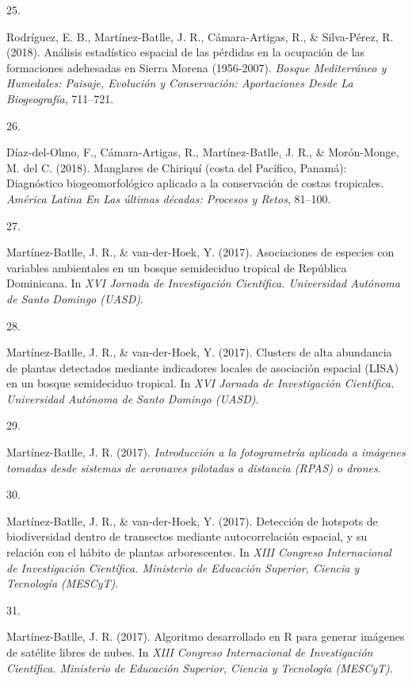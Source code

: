 \documentclass[10pt,a4paper,]{article}
\newlength{\cslhangindent}
\newlength{\csllabelwidth}
\newcommand{\CSLLeftMargin}[1]{\parbox[t]{\csllabelwidth}{\hfill #1~}}
\newcommand{\CSLRightInline}[1]{\parbox[t]{\linewidth - \cslhangindent - \csllabelwidth}{#1}\vspace{0.8ex}}
\begin{document}
\leavevmode\hypertarget{ref-rodriguez2018analisis}{}%
\CSLLeftMargin{25. }
\CSLRightInline{Rodríguez, E. B., Martínez-Batlle, J. R.,
Cámara-Artigas, R., \& Silva-Pérez, R. (2018). Análisis estadístico
espacial de las pérdidas en la ocupación de las formaciones adehesadas
en Sierra Morena (1956-2007). \emph{Bosque Mediterráneo y Humedales:
Paisaje, Evolución y Conservación: Aportaciones Desde La Biogeografía},
711--721.}

\leavevmode\hypertarget{ref-del2018manglares}{}%
\CSLLeftMargin{26. }
\CSLRightInline{Díaz-del-Olmo, F., Cámara-Artigas, R., Martínez-Batlle,
J. R., \& Morón-Monge, M. del C. (2018). Manglares de Chiriquí (costa
del Pacífico, Panamá): Diagnóstico biogeomorfológico aplicado a la
conservación de costas tropicales. \emph{América Latina En Las últimas
décadas: Procesos y Retos}, 81--100.}

\leavevmode\hypertarget{ref-Jose_Ramon_Martinez-Batlle_108105108}{}%
\CSLLeftMargin{27. }
\CSLRightInline{Martínez-Batlle, J. R., \& van-der-Hoek, Y. (2017).
Asociaciones de especies con variables ambientales en un bosque
semideciduo tropical de República Dominicana. In \emph{XVI Jornada de
Investigación Científica. Universidad Autónoma de Santo Domingo
(UASD)}.}

\leavevmode\hypertarget{ref-Jose_Ramon_Martinez-Batlle_108105172}{}%
\CSLLeftMargin{28. }
\CSLRightInline{Martínez-Batlle, J. R., \& van-der-Hoek, Y. (2017).
Clusters de alta abundancia de plantas detectados mediante indicadores
locales de asociación espacial (LISA) en un bosque semideciduo tropical.
In \emph{XVI Jornada de Investigación Científica. Universidad Autónoma
de Santo Domingo (UASD)}.}

\leavevmode\hypertarget{ref-Jose_Ramon_Martinez-Batlle_108520061}{}%
\CSLLeftMargin{29. }
\CSLRightInline{Martínez-Batlle, J. R. (2017). \emph{Introducción a la
fotogrametría aplicada a imágenes tomadas desde sistemas de aeronaves
pilotadas a distancia (RPAS) o drones}.}

\leavevmode\hypertarget{ref-Jose_Ramon_Martinez-Batlle_108008472}{}%
\CSLLeftMargin{30. }
\CSLRightInline{Martínez-Batlle, J. R., \& van-der-Hoek, Y. (2017).
Detección de hotspots de biodiversidad dentro de transectos mediante
autocorrelación espacial, y su relación con el hábito de plantas
arborescentes. In \emph{XIII Congreso Internacional de Investigación
Científica. Ministerio de Educación Superior, Ciencia y Tecnología
(MESCyT)}.}

\leavevmode\hypertarget{ref-Jose_Ramon_Martinez-Batlle_108008490}{}%
\CSLLeftMargin{31. }
\CSLRightInline{Martínez-Batlle, J. R. (2017). Algoritmo desarrollado en
R para generar imágenes de satélite libres de nubes. In \emph{XIII
Congreso Internacional de Investigación Científica. Ministerio de
Educación Superior, Ciencia y Tecnología (MESCyT)}.}
\end{document}
